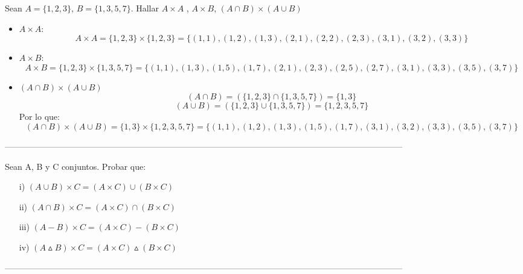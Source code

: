 \documentclass[10pt]{article}
\begin{document}
\begin{ej}
Sean $A= \{ 1,2,3 \}$, $B= \{ 1, 3, 5,7 \}$. Hallar $A \times A$ , $A \times B$, $(A \cap B) \times (A \cup B)$ 

\begin{itemize}
	\item $A \times A$: 
		$$A \times A = \{ 1,2,3 \} \times \{ 1,2,3 \} = \{ (1,1), (1,2), (1,3) , (2,1), (2,2), (2,3), (3,1) , (3,2), (3,3) \}$$
	\item $A \times B$: 	
		$$A \times B = \{ 1,2,3 \} \times \{ 1, 3, 5,7 \} = \{ (1,1), (1,3), (1,5) , (1,7), (2,1), (2,3), (2,5) , (2,7), (3,1), (3,3), (3,5) , (3,7) \}$$
	\item	$(A \cap B) \times (A \cup B)$
	$$(A \cap B) = (\{ 1,2,3 \} \cap  \{ 1, 3, 5,7 \}) = \{ 1, 3 \}$$
	$$(A \cup B) = (\{ 1,2,3 \} \cup  \{ 1, 3, 5,7 \}) = \{ 1, 2, 3, 5,7 \}$$
	Por lo que:
	$$(A \cap B) \times (A \cup B) = \{ 1, 3 \} \times \{ 1, 2, 3, 5,7 \} = \{ (1, 1), (1, 2), (1, 3), (1, 5), (1, 7), (3, 1), (3, 2), (3, 3), (3, 5), (3, 7)  \}$$
\end{itemize}

\end{ej}
---------------------------------------------------------------------------------------------------------------------------------------------
\begin{ej}
Sean A, B y C conjuntos. Probar que:
\begin{itemize}
	\item[i)] $(A \cup B) \times C = (A \times C) \cup (B \times C)$ 
	\item[ii)] $(A \cap B) \times C = (A \times C) \cap (B \times C)$
	\item[iii)] $(A - B) \times C = (A \times C) - (B \times C)$
	\item[iv)] $(A \vartriangle B) \times C = (A \times C) \vartriangle (B \times C)$
\end{itemize}
\end{ej}
---------------------------------------------------------------------------------------------------------------------------------------------
\newpage
\end{document}
